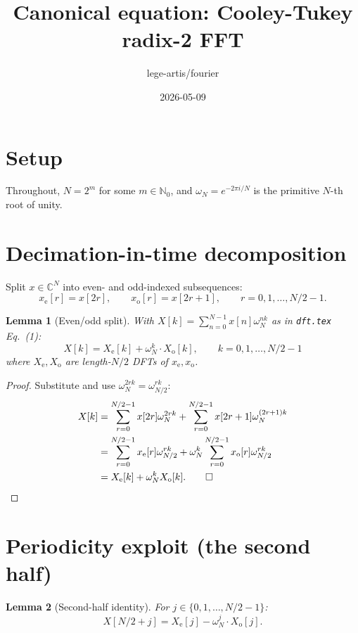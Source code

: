 \documentclass[11pt,a4paper]{article}
\title{Canonical equation: Cooley-Tukey radix-2 FFT}
\author{lege-artis/fourier}
\date{2026-05-09}
\theoremstyle{plain}
\newtheorem{lemma}{Lemma}
\begin{document}
\maketitle

\section{Setup}

Throughout, $N = 2^m$ for some $m \in \mathbb{N}_0$, and $\omega_N = e^{-2\pi i / N}$
is the primitive $N$-th root of unity.

\section{Decimation-in-time decomposition}

Split $x \in \mathbb{C}^N$ into even- and odd-indexed subsequences:
\[
x_{\mathrm{e}}[r] = x[2r], \qquad x_{\mathrm{o}}[r] = x[2r+1], \qquad r = 0, 1, \ldots, N/2 - 1.
\]

\begin{lemma}[Even/odd split]
\label{lem:split}
With $X[k] = \sum_{n=0}^{N-1} x[n] \omega_N^{nk}$ as in \texttt{dft.tex} Eq.~(1):
\begin{equation}
\label{eq:fft-split}
X[k] = X_{\mathrm{e}}[k] + \omega_N^k \cdot X_{\mathrm{o}}[k], \qquad k = 0, 1, \ldots, N/2 - 1
\end{equation}
where $X_{\mathrm{e}}, X_{\mathrm{o}}$ are length-$N/2$ DFTs of $x_{\mathrm{e}}, x_{\mathrm{o}}$.
\end{lemma}

\begin{proof}
Substitute and use $\omega_N^{2rk} = \omega_{N/2}^{rk}$:
\begin{align*}
X[k] &= \sum_{r=0}^{N/2-1} x[2r] \omega_N^{2rk} + \sum_{r=0}^{N/2-1} x[2r+1] \omega_N^{(2r+1)k} \\
     &= \sum_{r=0}^{N/2-1} x_{\mathrm{e}}[r] \omega_{N/2}^{rk} + \omega_N^k \sum_{r=0}^{N/2-1} x_{\mathrm{o}}[r] \omega_{N/2}^{rk} \\
     &= X_{\mathrm{e}}[k] + \omega_N^k X_{\mathrm{o}}[k]. \qed
\end{align*}
\end{proof}

\section{Periodicity exploit (the second half)}

\begin{lemma}[Second-half identity]
\label{lem:second-half}
For $j \in \{0, 1, \ldots, N/2-1\}$:
\begin{equation}
\label{eq:fft-second-half}
X[N/2 + j] = X_{\mathrm{e}}[j] - \omega_N^j \cdot X_{\mathrm{o}}[j].
\end{equation}
\end{lemma}
\end{document}
